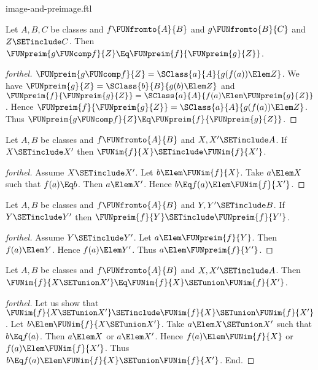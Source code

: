 \documentclass{stex}
\begin{document}
\begin{smodule}{image-and-preimage.ftl}
\begin{proposition}[forthel,id=FOUNDATIONS_07_6824917886566400]
  Let $A, B, C$ be classes and $f \FUNfromto{A}{B}$ and $g \FUNfromto{B}{C}$ and $Z \SETinclude C$.
  Then $\FUNpreim{g \FUNcomp f}{Z} \Eq \FUNpreim{f}{\FUNpreim{g}{Z}}$.
\end{proposition}
\begin{proof}[forthel]
  $\FUNpreim{g \FUNcomp f}{Z} = \SClass{a}{A}{g(f(a)) \Elem Z}$.
  We have $\FUNpreim{g}{Z} = \SClass{b}{B}{g(b) \Elem Z}$ and $\FUNpreim{f}{\FUNpreim{g}{Z}} = \SClass{a}{A}{f(a) \Elem \FUNpreim{g}{Z}}$.
  Hence $\FUNpreim{f}{\FUNpreim{g}{Z}} = \SClass{a}{A}{g(f(a)) \Elem Z}$.
  Thus $\FUNpreim{g \FUNcomp f}{Z} \Eq \FUNpreim{f}{\FUNpreim{g}{Z}}$.
\end{proof}

\begin{proposition}[forthel,id=FOUNDATIONS_07_7396318576115712]
  Let $A, B$ be classes and $f \FUNfromto{A}{B}$ and $X, X' \SETinclude A$.
  If $X \SETinclude X'$ then $\FUNim{f}{X} \SETinclude \FUNim{f}{X'}$.
\end{proposition}
\begin{proof}[forthel]
  Assume $X \SETinclude X'$.
  Let $b \Elem \FUNim{f}{X}$.
  Take $a \Elem X$ such that $f(a) \Eq b$.
  Then $a \Elem X'$.
  Hence $b \Eq f(a) \Elem \FUNim{f}{X'}$.
\end{proof}

\begin{proposition}[forthel,id=FOUNDATIONS_07_8376448628817920]
  Let $A, B$ be classes and $f \FUNfromto{A}{B}$ and $Y, Y' \SETinclude B$.
  If $Y \SETinclude Y'$ then $\FUNpreim{f}{Y} \SETinclude \FUNpreim{f}{Y'}$.
\end{proposition}
\begin{proof}[forthel]
  Assume $Y \SETinclude Y'$.
  Let $a \Elem \FUNpreim{f}{Y}$.
  Then $f(a) \Elem Y$.
  Hence $f(a) \Elem Y'$.
  Thus $a \Elem \FUNpreim{f}{Y'}$.
\end{proof}

\begin{proposition}[forthel,id=FOUNDATIONS_07_4448961469349888]
  Let $A, B$ be classes and $f \FUNfromto{A}{B}$ and $X, X' \SETinclude A$.
  Then $\FUNim{f}{X \SETunion X'} \Eq \FUNim{f}{X} \SETunion \FUNim{f}{X'}$.
\end{proposition}
\begin{proof}[forthel]
  Let us show that $\FUNim{f}{X \SETunion X'} \SETinclude \FUNim{f}{X} \SETunion \FUNim{f}{X'}$.
    Let $b \Elem \FUNim{f}{X \SETunion X'}$.
    Take $a \Elem X \SETunion X'$ such that $b \Eq f(a)$.
    Then $a \Elem X$ or $a \Elem X'$.
    Hence $f(a) \Elem \FUNim{f}{X}$ or $f(a) \Elem \FUNim{f}{X'}$.
    Thus $b \Eq f(a) \Elem \FUNim{f}{X} \SETunion \FUNim{f}{X'}$.
  End.


\end{proof}
\end{smodule}
\end{document}
